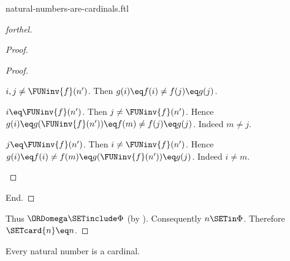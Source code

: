 \documentclass{naproche-library}
\begin{document}
\begin{smodule}[title=Natural Numbers are Cardinal Numbers]{natural-numbers-are-cardinals.ftl}
\begin{proof}[forthel]
\begin{proof}
\begin{proof}
        \begin{case}{$i, j \neq \FUNinv{f}(n')$.}
          Then $g(i)
            \eq f(i)
            \neq f(j)
            \eq g(j)$.
        \end{case}

        \begin{case}{$i \eq \FUNinv{f}(n')$.}
          Then $j \neq \FUNinv{f}(n')$.
          Hence $g(i)
            \eq g(\FUNinv{f}(n'))
            \eq f(m)
            \neq f(j)
            \eq g(j)$.
          Indeed $m \neq j$.
        \end{case}

        \begin{case}{$j \eq \FUNinv{f}(n')$.}
          Then $i \neq \FUNinv{f}(n')$.
          Hence $g(i)
            \eq f(i)
            \neq f(m)
            \eq g(\FUNinv{f}(n'))
            \eq g(j)$.
          Indeed $i \neq m$.
        \end{case}
      \end{proof}
    End.
  \end{proof}

  Thus $\ORDomega \SETinclude \Phi$ (by ).
  Consequently $n \SETin \Phi$.
  Therefore $\SETcard{n} \eq n$.
\end{proof}

\begin{corollary}[forthel,id=SET_THEORY_07_7061392098066432]
  Every natural number is a cardinal.
\end{corollary}
\end{smodule}
\end{document}
